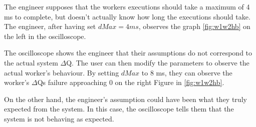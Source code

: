         The engineer supposes that the workers executions should take a maximum of 4 ms to complete, but doesn't actually know how long the executions should take. The engineer, after having set $dMax = 4ms$, observes the graph \cref{fig:w1w2hb} on the left in the oscilloscope.

    The oscilloscope shows the engineer that their assumptions do not correspond to the actual system $\Delta$Q. The user can then modify the parameters to observe the actual worker's behaviour. By setting $dMax$ to 8 ms, they can observe the worker's $\Delta$Qs failure approaching $0$ on the right Figure in \cref{fig:w1w2hb}.

    On the other hand, the engineer's assumption could have been what they truly expected from the system. In this case, the oscilloscope tells them that the system is not behaving as expected. 

